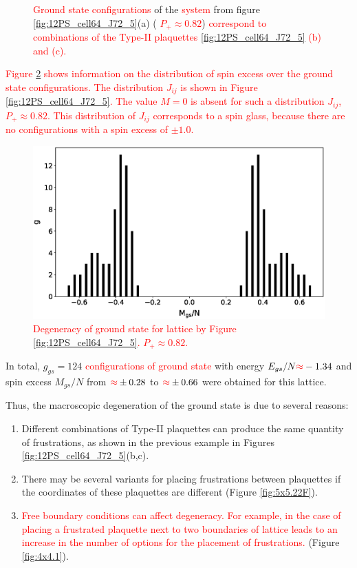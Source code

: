\documentclass[preprint,12pt]{elsarticle}
\begin{document}
\begin{figure}[H]
\begin{minipage}[h]{0.3\linewidth}
		\end{minipage}
		\caption{\textcolor{red}{Ground state configurations} of the \textcolor{red}{system} from figure \ref{fig:12PS_cell64_J72_5}(a) (\textcolor{red}{  $P_+\approx0.82$}) \textcolor{red}{correspond to combinations of the Type-II plaquettes \ref{fig:12PS_cell64_J72_5} (b) and (c).}}
		\label{fig:12F_cell64_J72_5}
	\end{figure}
	
	\textcolor{red}{Figure \ref{fig:g_Mgs} shows information on the distribution of spin excess over the ground state configurations. The distribution $J_{ij}$ is shown in Figure \ref{fig:12PS_cell64_J72_5}. The value $M=0$ is absent for such a distribution $J_{ij}$, $P_+\approx0.82$. This distribution of $J_{ij}$ corresponds to a spin glass, because there are no configurations with a spin excess of $\pm1.0$.}
	
	\begin{figure}[H]
		\centering
		\includegraphics[width=0.8\linewidth]{pictures/g_Mgs.eps}
		\caption{\textcolor{red}{Degeneracy of ground state for lattice by Figure \ref{fig:12PS_cell64_J72_5}. $P_+\approx0.82$.}}
		\label{fig:g_Mgs}
	\end{figure}
	
	In total, $g_{gs}=124$ \textcolor{red}{configurations of ground state} with energy $E_{gs}/N\textcolor{red}{\approx}-1.34$ and spin excess $M_{gs}/N$ from $\textcolor{red}{\approx}\pm 0.28$ to $\textcolor{red}{\approx}\pm 0.66$ were obtained for this lattice. 
	
	Thus, the macroscopic degeneration of the ground state is due to several reasons:
	
	\begin{enumerate}
		\item Different combinations of Type-II plaquettes can produce the same quantity of frustrations, as shown in the previous example in Figures \ref{fig:12PS_cell64_J72_5}(b,c).
		\item There may be several variants for placing frustrations between plaquettes if the coordinates of these plaquettes are different (Figure \ref{fig:5x5.22F}).
		\item \textcolor{red}{Free boundary conditions can affect degeneracy. For example, in the case of placing a frustrated plaquette next to two boundaries of lattice leads to an increase in the number of options for the placement of frustrations.} (Figure \ref{fig:4x4.1}).
	\end{enumerate}
	
\end{document}
